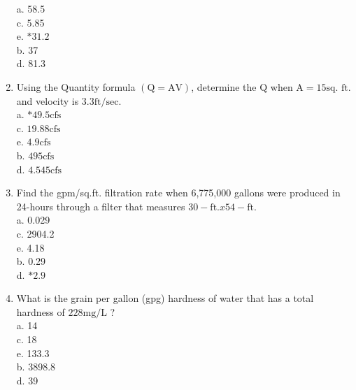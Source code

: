 \begin{enumerate}
a. 58.5\\
c. 5.85\\
e. $* 31.2$\\
b. 37\\
d. 81.3\\
\item Using the Quantity formula $(\mathrm{Q}=\mathrm{AV})$, determine the $\mathrm{Q}$ when $\mathrm{A}=15 \mathrm{sq}$. $\mathrm{ft}$. and velocity is $3.3 \mathrm{ft} / \mathrm{sec}$.\\
a. $* 49.5 \mathrm{cfs}$\\
c. $19.88 \mathrm{cfs}$\\
e. $4.9 \mathrm{cfs}$\\
b. $495 \mathrm{cfs}$\\
d. $4.545 \mathrm{cfs}$\\
\item Find the gpm/sq.ft. filtration rate when 6,775,000 gallons were produced in 24-hours through a filter that measures $30-\mathrm{ft} . x 54-\mathrm{ft}$.\\
a. 0.029\\
c. 2904.2\\
e. 4.18\\
b. 0.29\\
d. $* 2.9$\\

\item What is the grain per gallon (gpg) hardness of water that has a total hardness of $228 \mathrm{mg} / \mathrm{L}$ ?\\
a. 14\\
c. 18\\
e. 133.3\\
b. 3898.8\\
d. 39\\


\end{enumerate}
